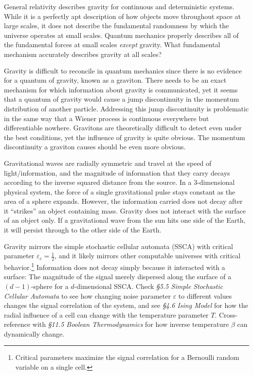 \documentclass[10pt, a5paper, twoside, openright]{memoir}
\begin{document}
General relativity describes gravity for continuous and deterministic systems. While it is a perfectly apt description of how objects move throughout space at large scales, it does not describe the fundamental randomness by which the universe operates at small scales. Quantum mechanics properly describes all of the fundamental forces at small scales \textit{except} gravity. What fundamental mechanism accurately describes gravity at all scales?

Gravity is difficult to reconcile in quantum mechanics since there is no evidence for a quantum of gravity, known as a graviton. There needs to be an exact mechanism for which information about gravity is communicated, yet it seems that a quantum of gravity would cause a jump discontinuity in the momentum distribution of another particle. Addressing this jump discontinuity is problematic in the same way that a Wiener process is continuous everywhere but differentiable nowhere. Gravitons are theoretically difficult to detect even under the best conditions, yet the influence of gravity is quite obvious. The momentum discontinuity a graviton causes should be even more obvious.

Gravitational waves are radially symmetric and travel at the speed of light/information, and the magnitude of information that they carry decays according to the inverse squared distance from the source. In a $3$-dimensional physical system, the force of a single gravitational pulse stays constant as the area of a sphere expands. However, the information carried does not decay after it ``strikes'' an object containing mass. Gravity does not interact with the surface of an object only. If a gravitational wave from the sun hits one side of the Earth, it will persist through to the other side of the Earth.

Gravity mirrors the simple stochastic cellular automata (SSCA) with critical parameter $\varepsilon_c = \frac{1}{2}$, and it likely mirrors other computable universes with critical behavior.\footnote{Critical parameters maximize the signal correlation for a Bernoulli random variable on a single cell.} Information does not decay simply because it interacted with a surface: The magnitude of the signal merely dispersed along the surface of a $(d-1)$-sphere for a $d$-dimensional SSCA. Check \textit{\S 5.5 Simple Stochastic Cellular Automata} to see how changing noise parameter $\varepsilon$ to different values changes the signal correlation of the system, and see \textit{\S 4.6 Ising Model} for how the radial influence of a cell can change with the temperature parameter $T$. Cross-reference with \textit{\S 11.5 Boolean Thermodynamics} for how inverse temperature $\beta$ can dynamically change.
\end{document}
